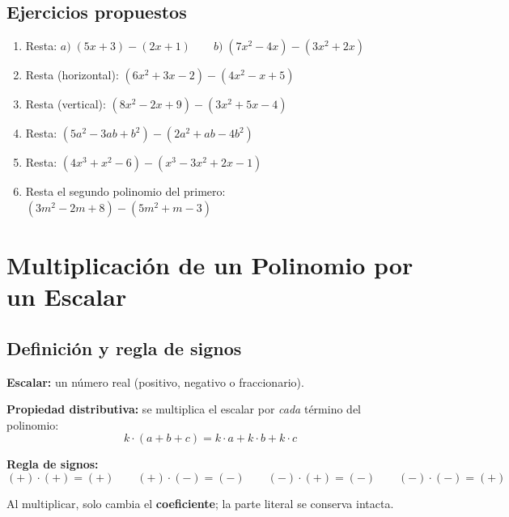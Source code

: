\documentclass[12pt, letterpaper]{article}
\begin{document}
\subsection{Ejercicios propuestos}

\begin{enumerate}[leftmargin=*, resume]
  \item \facil{} Resta: $a) \; (5x + 3) - (2x + 1) \qquad b) \; (7x^2 - 4x) - (3x^2 + 2x)$

  \item \facil{} Resta (horizontal): $(6x^2 + 3x - 2) - (4x^2 - x + 5)$

  \item \facil{} Resta (vertical): $(8x^2 - 2x + 9) - (3x^2 + 5x - 4)$

  \item \medio{} Resta: $(5a^2 - 3ab + b^2) - (2a^2 + ab - 4b^2)$

  \item \medio{} Resta: $(4x^3 + x^2 - 6) - (x^3 - 3x^2 + 2x - 1)$

  \item \medio{} Resta el segundo polinomio del primero: $(3m^2 - 2m + 8) - (5m^2 + m - 3)$
\end{enumerate}

\newpage

\section{Multiplicación de un Polinomio por un Escalar}

\subsection{Definición y regla de signos}

\begin{cuadroteoria}
  \textbf{Escalar:} un número real (positivo, negativo o fraccionario).

  \textbf{Propiedad distributiva:} se multiplica el escalar por \emph{cada} término del polinomio:
  $$k \cdot (a + b + c) = k \cdot a + k \cdot b + k \cdot c$$

  \textbf{Regla de signos:}
  $$(+) \cdot (+) = (+) \qquad (+) \cdot (-) = (-) \qquad (-) \cdot (+) = (-) \qquad (-) \cdot (-) = (+)$$

  Al multiplicar, solo cambia el \textbf{coeficiente}; la parte literal se conserva intacta.
\end{cuadroteoria}
\end{document}
